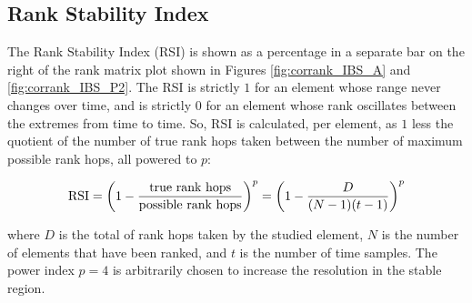 \subsection*{Rank Stability Index}\label{sec:RSI}

The Rank Stability Index (RSI) is shown as a percentage in a separate bar on the right of the rank matrix plot shown in Figures \ref{fig:corrank_IBS_A} and \ref{fig:corrank_IBS_P2}. The RSI is strictly $1$ for an element whose range never changes over time, and is strictly $0$ for an element whose rank oscillates between the extremes from time to time. So, RSI is calculated, per element, as $1$ less the quotient of the number of true rank hops taken between the number of maximum possible rank hops, all powered to $p$:
\begin{linenomath}
$${\rm RSI} = \left(1-\frac{\text{true rank hops}}{\text{possible rank hops}}\right)^p = \left(1-\frac{D}{(N-1)(t-1)}\right)^p$$
\end{linenomath}
where $D$ is the total of rank hops taken by the studied element, $N$ is the number of elements that have been ranked, and $t$ is the number of time samples. The power index $p=4$ is arbitrarily chosen to increase the resolution in the stable region. 

